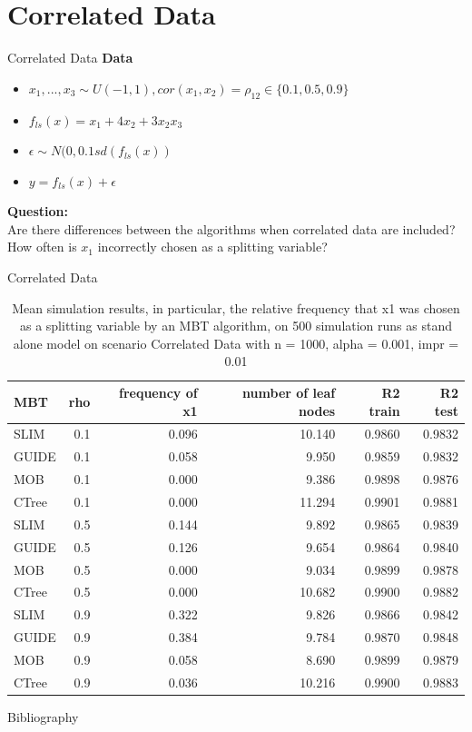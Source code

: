 \documentclass[9pt, xcolor=table]{beamer}
\begin{document}
\section{Correlated Data}
\begin{frame}{Correlated Data}
\textbf{Data}
\begin{itemize}
    \item $x_1,..., x_3 \sim U(-1,1), cor(x_1,x_2) = \rho_{12} \in \{0.1, 0.5, 0.9\}$ 
    \item $ f_{ls}(x) = x_1 + 4   x_2 + 3   x_2   x_3 $
    \item $\epsilon \sim N(0, 0.1 sd(f_{ls}(x))$
    \item $y = f_{ls}(x) + \epsilon$
\end{itemize}

\textbf{Question:} \\
Are there differences between the algorithms when correlated data are included? How often is $x_1$ incorrectly chosen as a splitting variable?
    
\end{frame}

\begin{frame}{Correlated Data}
\begin{table}

\caption{Mean simulation results, in particular, the relative frequency that x1 was chosen as a splitting variable by an MBT algorithm, on 500 simulation runs as stand alone model on scenario Correlated Data with n = 1000, alpha = 0.001, impr = 0.01}
\centering
\begin{tabular}[t]{l|r|r|r|r|r}
\hline
MBT & rho & frequency of x1  & number of leaf nodes & R2 train & R2 test\\
\hline
SLIM & 0.1 & 0.096 & 10.140 & 0.9860 & 0.9832\\
\hline
GUIDE & 0.1 & 0.058 & 9.950 & 0.9859 & 0.9832\\
\hline
MOB & 0.1 & 0.000 & 9.386 & 0.9898 & 0.9876\\
\hline
CTree & 0.1 & 0.000 & 11.294 & 0.9901 & 0.9881\\
\hline
SLIM & 0.5 & 0.144 & 9.892 & 0.9865 & 0.9839\\
\hline
GUIDE & 0.5 & 0.126 & 9.654 & 0.9864 & 0.9840\\
\hline
MOB & 0.5 & 0.000 & 9.034 & 0.9899 & 0.9878\\
\hline
CTree & 0.5 & 0.000 & 10.682 & 0.9900 & 0.9882\\
\hline
SLIM & 0.9 & 0.322 & 9.826 & 0.9866 & 0.9842\\
\hline
GUIDE & 0.9 & 0.384 & 9.784 & 0.9870 & 0.9848\\
\hline
MOB & 0.9 & 0.058 & 8.690 & 0.9899 & 0.9879\\
\hline
CTree & 0.9 & 0.036 & 10.216 & 0.9900 & 0.9883\\
\hline
\end{tabular}
\end{table}    
\end{frame}


\begin{frame}{Bibliography}
    
    

\end{frame}
\end{document}
